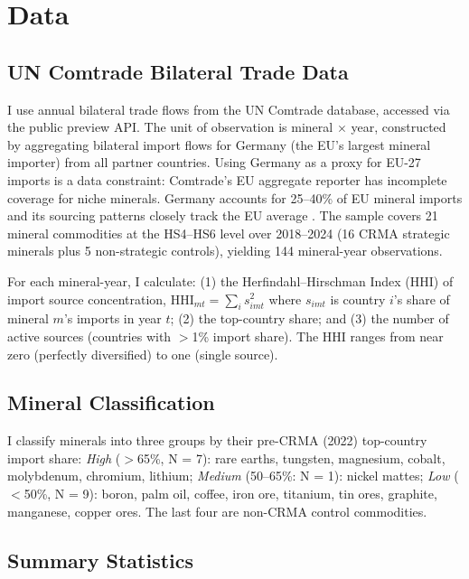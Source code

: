 \documentclass[12pt]{article}
\begin{document}
\section{Data}

\subsection{UN Comtrade Bilateral Trade Data}

I use annual bilateral trade flows from the UN Comtrade database, accessed via the public preview API. The unit of observation is mineral $\times$ year, constructed by aggregating bilateral import flows for Germany (the EU's largest mineral importer) from all partner countries. Using Germany as a proxy for EU-27 imports is a data constraint: Comtrade's EU aggregate reporter has incomplete coverage for niche minerals. Germany accounts for 25--40\% of EU mineral imports and its sourcing patterns closely track the EU average \citep{oecd2023minerals}. The sample covers 21 mineral commodities at the HS4--HS6 level over 2018--2024 (16 CRMA strategic minerals plus 5 non-strategic controls), yielding 144 mineral-year observations.

For each mineral-year, I calculate: (1) the Herfindahl--Hirschman Index (HHI) of import source concentration, $\text{HHI}_{mt} = \sum_i s_{imt}^2$ where $s_{imt}$ is country $i$'s share of mineral $m$'s imports in year $t$; (2) the top-country share; and (3) the number of active sources (countries with $>$1\% import share). The HHI ranges from near zero (perfectly diversified) to one (single source).

\subsection{Mineral Classification}

I classify minerals into three groups by their pre-CRMA (2022) top-country import share: \textit{High} ($>$65\%, N = 7): rare earths, tungsten, magnesium, cobalt, molybdenum, chromium, lithium; \textit{Medium} (50--65\%: N = 1): nickel mattes; \textit{Low} ($<$50\%, N = 9): boron, palm oil, coffee, iron ore, titanium, tin ores, graphite, manganese, copper ores. The last four are non-CRMA control commodities.

\subsection{Summary Statistics}
\end{document}
